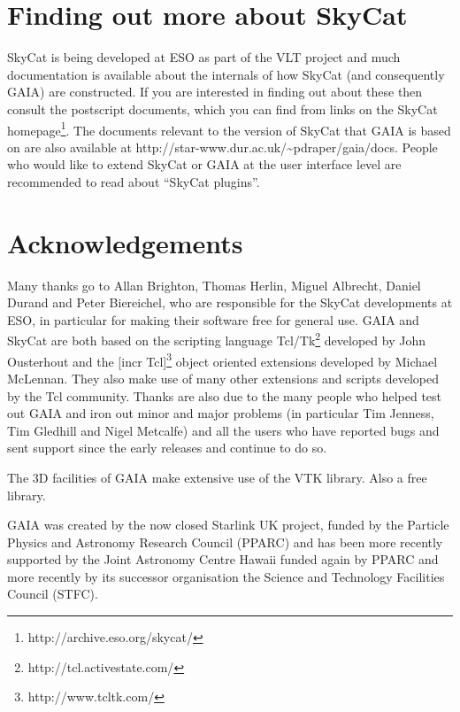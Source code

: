 \documentclass[twoside,11pt]{article}
\newcommand{\htmladdnormallinkfoot}[2]{#1\footnote{#2}}
\newcommand{\htmladdnormallink}[2]{#1}
\newcommand{\xlabel}[1]{}
\renewcommand{\_}{\texttt{\symbol{95}}}
\begin{document}
\section{\xlabel{finding_out_more_about_skycat}Finding out more about SkyCat}
\htmladdnormallink{SkyCat}{http://archive.eso.org/skycat/} is being
developed at \htmladdnormallink{ESO}{http://www.eso.org/} as part of
the \htmladdnormallink{VLT}{http://www.eso.org/vlt/} project and much
documentation is available about the internals of how SkyCat (and
consequently GAIA) are constructed. If you are interested in finding
out about these then consult the postscript documents, which you can
find from links on the \htmladdnormallinkfoot{SkyCat
homepage}{http://archive.eso.org/skycat/}. The documents relevant to
the version of SkyCat that GAIA is based on are also available at
\htmladdnormallink{http://star-www.dur.ac.uk/\~{}pdraper/gaia/docs}
{http://star-www.dur.ac.uk/~pdraper/gaia/docs}. People who would like
to extend SkyCat or GAIA at the user interface level are recommended
to read about ``SkyCat plugins''.


\section{\xlabel{acknowledgements}Acknowledgements}

Many thanks go to Allan Brighton, Thomas Herlin, Miguel Albrecht,
Daniel Durand and Peter Biereichel, who are responsible for the
\htmladdnormallink{SkyCat}{http://archive.eso.org/skycat/}
developments at ESO, in particular for making their software free for
general use.
GAIA and SkyCat are both based on the scripting language
\htmladdnormallinkfoot{Tcl/Tk}{http://tcl.activestate.com/} developed by
John Ousterhout and the \htmladdnormallinkfoot{[incr Tcl]}
{http://www.tcltk.com/} object oriented extensions developed by
Michael McLennan.
They also make use of many other extensions and scripts developed by
the Tcl community.
Thanks are also due to the many people who helped test out GAIA and
iron out minor and major problems (in particular Tim Jenness, Tim
Gledhill and Nigel Metcalfe) and all the users who have reported bugs
and sent support since the early releases and continue to do so.

The 3D facilities of GAIA make extensive use of the 
\htmladdnormallink{VTK}{http://www.kitware.com} library. Also a free
library.

GAIA was created by the now closed Starlink UK project, funded by the Particle
Physics and Astronomy Research Council (PPARC) and has been more recently
supported by the Joint Astronomy Centre Hawaii funded again by PPARC and more
recently by its successor organisation the Science and Technology Facilities
Council (STFC).

\end{document}
